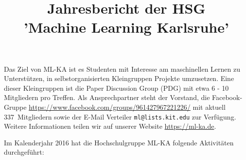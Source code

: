 \documentclass[a4paper]{scrartcl}
\title{Jahresbericht der HSG\\'Machine Learning Karlsruhe'}
\begin{document}
\maketitle

Das Ziel von ML-KA ist es Studenten mit Interesse am maschinellen Lernen zu
Unterstützen, in selbstorganisierten Kleingruppen Projekte umzusetzen. Eine
dieser Kleingruppen ist die Paper Discussion Group (PDG) mit etwa 6 - 10
Mitgliedern pro Treffen. Als Ansprechpartner steht der Vorstand, die Facebook-Gruppe \url{https://www.facebook.com/groups/961427967221226/} mit aktuell 337~Mitgliedern sowie der E-Mail Verteiler
\verb+ml@lists.kit.edu+ zur Verfügung. Weitere Informationen teilen wir auf
unserer Website
\url{https://ml-ka.de}.

Im Kalenderjahr 2016 hat die Hochschulgruppe ML-KA folgende Aktivitäten
durchgeführt:
\end{document}
